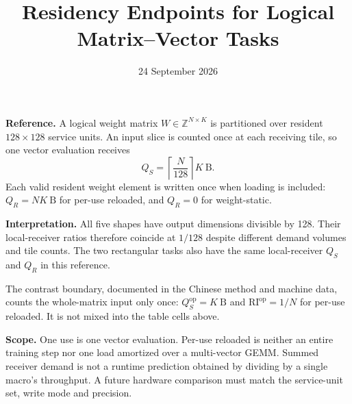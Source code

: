 \documentclass[10pt,a4paper]{article}
\title{\bfseries Residency Endpoints for Logical Matrix--Vector Tasks}
\author{}
\date{24 September 2026}
\begin{document}
\maketitle
\vspace{-1em}
\textbf{Reference.} A logical weight matrix $W\in\mathbb{Z}^{N\times K}$ is partitioned over resident $128\times128$ service units. An input slice is counted once at each receiving tile, so one vector evaluation receives
\[
Q_S=\left\lceil\frac{N}{128}\right\rceil K\ \mathrm{B}.
\]
Each valid resident weight element is written once when loading is included:
$Q_R=NK\ \mathrm{B}$ for per-use reloaded, and $Q_R=0$ for weight-static.


\FloatBarrier

\textbf{Interpretation.} All five shapes have output dimensions divisible by 128. Their local-receiver ratios therefore coincide at $1/128$ despite different demand volumes and tile counts. The two rectangular tasks also have the same local-receiver $Q_S$ and $Q_R$ in this reference.

The contrast boundary, documented in the Chinese method and machine data, counts the whole-matrix input only once: $Q_S^{\mathrm{op}}=K\ \mathrm{B}$ and $\mathrm{RI}^{\mathrm{op}}=1/N$ for per-use reloaded. It is not mixed into the table cells above.

\textbf{Scope.} One use is one vector evaluation. Per-use reloaded is neither an entire training step nor one load amortized over a multi-vector GEMM. Summed receiver demand is not a runtime prediction obtained by dividing by a single macro's throughput. A future hardware comparison must match the service-unit set, write mode and precision.
\end{document}
